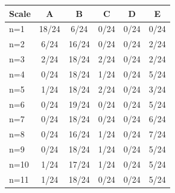 \begin{tabular}{lccccc}
\toprule
Scale & \cellcolor[HTML]{FFFFFF} A & \cellcolor[HTML]{EA4646} B & \cellcolor[HTML]{9670BD} C & \cellcolor[HTML]{8FEB32} D & \cellcolor[HTML]{19C8C8} E \\
\midrule
n=1 & \cellcolor[HTML]{FFFFFF} 18/24 & \cellcolor[HTML]{EA4646} 6/24 & \cellcolor[HTML]{9670BD} 0/24 & \cellcolor[HTML]{8FEB32} 0/24 & \cellcolor[HTML]{19C8C8} 0/24 \\
n=2 & \cellcolor[HTML]{FFFFFF} 6/24 & \cellcolor[HTML]{EA4646} 16/24 & \cellcolor[HTML]{9670BD} 0/24 & \cellcolor[HTML]{8FEB32} 0/24 & \cellcolor[HTML]{19C8C8} 2/24 \\
n=3 & \cellcolor[HTML]{FFFFFF} 2/24 & \cellcolor[HTML]{EA4646} 18/24 & \cellcolor[HTML]{9670BD} 2/24 & \cellcolor[HTML]{8FEB32} 0/24 & \cellcolor[HTML]{19C8C8} 2/24 \\
n=4 & \cellcolor[HTML]{FFFFFF} 0/24 & \cellcolor[HTML]{EA4646} 18/24 & \cellcolor[HTML]{9670BD} 1/24 & \cellcolor[HTML]{8FEB32} 0/24 & \cellcolor[HTML]{19C8C8} 5/24 \\
n=5 & \cellcolor[HTML]{FFFFFF} 1/24 & \cellcolor[HTML]{EA4646} 18/24 & \cellcolor[HTML]{9670BD} 2/24 & \cellcolor[HTML]{8FEB32} 0/24 & \cellcolor[HTML]{19C8C8} 3/24 \\
n=6 & \cellcolor[HTML]{FFFFFF} 0/24 & \cellcolor[HTML]{EA4646} 19/24 & \cellcolor[HTML]{9670BD} 0/24 & \cellcolor[HTML]{8FEB32} 0/24 & \cellcolor[HTML]{19C8C8} 5/24 \\
n=7 & \cellcolor[HTML]{FFFFFF} 0/24 & \cellcolor[HTML]{EA4646} 18/24 & \cellcolor[HTML]{9670BD} 0/24 & \cellcolor[HTML]{8FEB32} 0/24 & \cellcolor[HTML]{19C8C8} 6/24 \\
n=8 & \cellcolor[HTML]{FFFFFF} 0/24 & \cellcolor[HTML]{EA4646} 16/24 & \cellcolor[HTML]{9670BD} 1/24 & \cellcolor[HTML]{8FEB32} 0/24 & \cellcolor[HTML]{19C8C8} 7/24 \\
n=9 & \cellcolor[HTML]{FFFFFF} 0/24 & \cellcolor[HTML]{EA4646} 18/24 & \cellcolor[HTML]{9670BD} 1/24 & \cellcolor[HTML]{8FEB32} 0/24 & \cellcolor[HTML]{19C8C8} 5/24 \\
n=10 & \cellcolor[HTML]{FFFFFF} 1/24 & \cellcolor[HTML]{EA4646} 17/24 & \cellcolor[HTML]{9670BD} 1/24 & \cellcolor[HTML]{8FEB32} 0/24 & \cellcolor[HTML]{19C8C8} 5/24 \\
n=11 & \cellcolor[HTML]{FFFFFF} 1/24 & \cellcolor[HTML]{EA4646} 18/24 & \cellcolor[HTML]{9670BD} 0/24 & \cellcolor[HTML]{8FEB32} 0/24 & \cellcolor[HTML]{19C8C8} 5/24 \\

\end{tabular}
